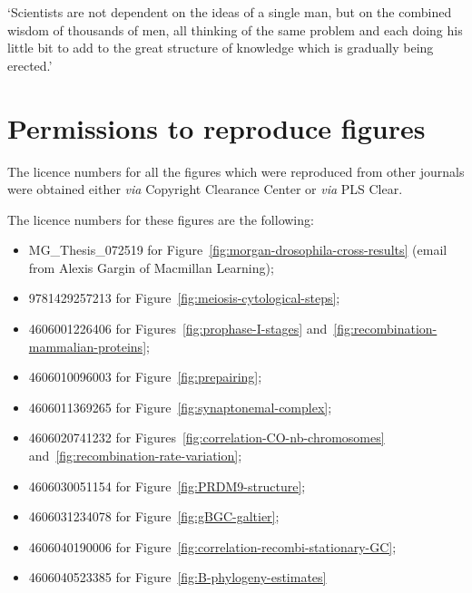 \begin{savequote}[8cm]

	‘Scientists are not dependent on the ideas of a single man, but on the combined wisdom of thousands of men, all thinking of the same problem and each doing his little bit to add to the great structure of knowledge which is gradually being erected.’

\end{savequote}

\chapter{\label{app:permissions}Permissions to reproduce figures}

\minitoc{}


The licence numbers for all the figures which were reproduced from other journals were obtained either \textit{via} Copyright Clearance Center or \textit{via} PLS Clear.

The licence numbers for these figures are the following:

\begin{itemize}
	\item{MG\_Thesis\_072519 for Figure~\ref{fig:morgan-drosophila-cross-results} (email from Alexis Gargin of Macmillan Learning);}
	\item{9781429257213 for Figure~\ref{fig:meiosis-cytological-steps};}
	\item{4606001226406 for Figures~\ref{fig:prophase-I-stages} and~\ref{fig:recombination-mammalian-proteins};}
	\item{4606010096003 for Figure~\ref{fig:prepairing};}
	\item{4606011369265 for Figure~\ref{fig:synaptonemal-complex};}

	\item{4606020741232 for Figures~\ref{fig:correlation-CO-nb-chromosomes} and~\ref{fig:recombination-rate-variation};}
	\item{4606030051154 for Figure~\ref{fig:PRDM9-structure};}

	\item{4606031234078 for Figure~\ref{fig:gBGC-galtier};}
	\item{4606040190006 for Figure~\ref{fig:correlation-recombi-stationary-GC};}
	\item{4606040523385 for Figure~\ref{fig:B-phylogeny-estimates}}

\end{itemize}

